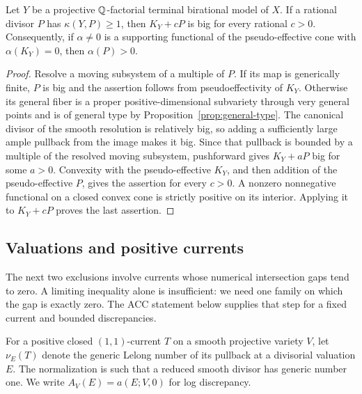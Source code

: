 \begin{corollary}\label{ex:supporting}
Let \(Y\) be a projective \(\mathbb{Q}\)-factorial terminal birational model
of \(X\). If a rational divisor \(P\) has \(\kappa(Y,P)\geq1\),
then \(K_Y+cP\) is big for every rational \(c>0\).
Consequently, if \(\alpha\neq0\) is a supporting functional of the
pseudo-effective cone with \(\alpha(K_Y)=0\), then
\(\alpha(P)>0\).
\end{corollary}
\begin{proof}
Resolve a moving subsystem of a multiple of \(P\). If its map is
generically finite, \(P\) is big and the assertion follows from
pseudoeffectivity of \(K_Y\). Otherwise its general fiber is a
proper positive-dimensional subvariety through very general
points and is of general type by Proposition~\ref{prop:general-type}.
The canonical divisor of the smooth resolution is relatively big,
so adding a sufficiently large ample pullback from the image makes
it big. Since that pullback is bounded by a multiple of the
resolved moving subsystem, pushforward gives \(K_Y+aP\) big for
some \(a>0\). Convexity with the pseudo-effective \(K_Y\), and then
addition of the pseudo-effective \(P\), gives the assertion for
every \(c>0\). A nonzero nonnegative functional on a closed convex
cone is strictly positive on its interior. Applying it to
\(K_Y+cP\) proves the last assertion.
\end{proof}

\subsection{Valuations and positive currents}

The next two exclusions involve currents whose numerical intersection
gaps tend to zero. A limiting inequality alone is insufficient: we
need one family on which the gap is exactly zero. The ACC statement
below supplies that step for a fixed current and bounded discrepancies.

For a positive closed \((1,1)\)-current \(T\) on a smooth projective
variety \(V\), let \(\nu_E(T)\) denote the generic Lelong number of
its pullback at a divisorial valuation \(E\). The normalization is
such that a reduced smooth divisor has generic number one. We
write \(A_V(E)=a(E;V,0)\) for log discrepancy.


